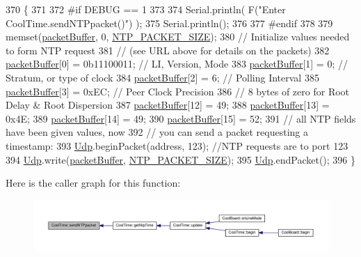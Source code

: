 \begin{DoxyCode}
370 \{
371 
372 \textcolor{preprocessor}{#if DEBUG == 1 }
373 
374     Serial.println( F(\textcolor{stringliteral}{"Enter CoolTime.sendNTPpacket()"}) );
375     Serial.println();
376 
377 \textcolor{preprocessor}{#endif}
378 
379     memset(\hyperlink{class_cool_time_a27e6abc82a5c2f72161956967005bec7}{packetBuffer}, 0, \hyperlink{_cool_time_8h_a56a6ea64006651b4f42adf713e244f06}{NTP\_PACKET\_SIZE});
380     \textcolor{comment}{// Initialize values needed to form NTP request}
381     \textcolor{comment}{// (see URL above for details on the packets)}
382     \hyperlink{class_cool_time_a27e6abc82a5c2f72161956967005bec7}{packetBuffer}[0] = 0b11100011;   \textcolor{comment}{// LI, Version, Mode}
383     \hyperlink{class_cool_time_a27e6abc82a5c2f72161956967005bec7}{packetBuffer}[1] = 0;     \textcolor{comment}{// Stratum, or type of clock}
384     \hyperlink{class_cool_time_a27e6abc82a5c2f72161956967005bec7}{packetBuffer}[2] = 6;     \textcolor{comment}{// Polling Interval}
385     \hyperlink{class_cool_time_a27e6abc82a5c2f72161956967005bec7}{packetBuffer}[3] = 0xEC;  \textcolor{comment}{// Peer Clock Precision}
386     \textcolor{comment}{// 8 bytes of zero for Root Delay & Root Dispersion}
387     \hyperlink{class_cool_time_a27e6abc82a5c2f72161956967005bec7}{packetBuffer}[12]  = 49;
388     \hyperlink{class_cool_time_a27e6abc82a5c2f72161956967005bec7}{packetBuffer}[13]  = 0x4E;
389     \hyperlink{class_cool_time_a27e6abc82a5c2f72161956967005bec7}{packetBuffer}[14]  = 49;
390     \hyperlink{class_cool_time_a27e6abc82a5c2f72161956967005bec7}{packetBuffer}[15]  = 52;
391     \textcolor{comment}{// all NTP fields have been given values, now}
392     \textcolor{comment}{// you can send a packet requesting a timestamp:                 }
393     \hyperlink{class_cool_time_a4e23216a8121ca79d0fb019f30884b92}{Udp}.beginPacket(address, 123); \textcolor{comment}{//NTP requests are to port 123}
394     \hyperlink{class_cool_time_a4e23216a8121ca79d0fb019f30884b92}{Udp}.write(\hyperlink{class_cool_time_a27e6abc82a5c2f72161956967005bec7}{packetBuffer}, \hyperlink{_cool_time_8h_a56a6ea64006651b4f42adf713e244f06}{NTP\_PACKET\_SIZE});
395     \hyperlink{class_cool_time_a4e23216a8121ca79d0fb019f30884b92}{Udp}.endPacket(); 
396 \}
\end{DoxyCode}
Here is the caller graph for this function\+:\nopagebreak
\begin{figure}[H]
\begin{center}
\leavevmode
\includegraphics[width=350pt]{d6/d49/class_cool_time_a236a38d120dc53bc67456d763838c5a1_icgraph}
\end{center}
\end{figure}
\mbox{\label{class_cool_time_ab81ea7fdaace111aa01cc1ec84c6d297}} 
